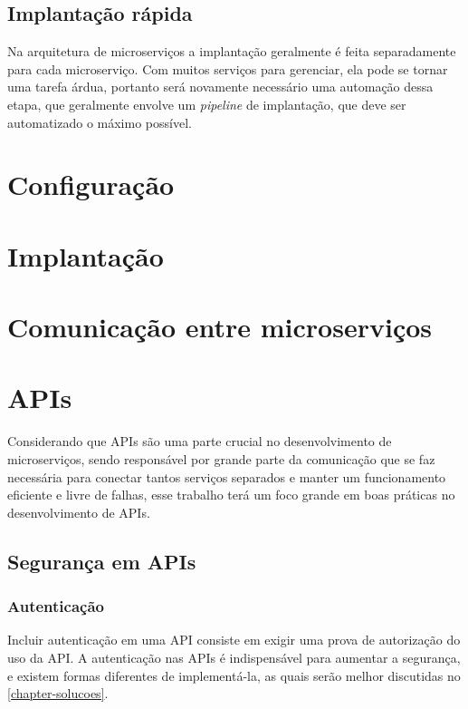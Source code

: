 \subsection{Implantação rápida}

Na arquitetura de microserviços a implantação geralmente é feita separadamente para cada microserviço. Com muitos serviços para gerenciar, ela pode se tornar uma tarefa árdua, portanto será novamente necessário uma automação dessa etapa, que geralmente envolve um \emph{pipeline} de implantação, que deve ser automatizado o máximo possível.

\section{Configuração}

\section{Implantação}

\section{Comunicação entre microserviços}

\section{APIs}

Considerando que APIs são uma parte crucial no desenvolvimento de microserviços, sendo responsável por grande parte da comunicação que se faz necessária para conectar tantos serviços separados e manter um funcionamento eficiente e livre de falhas, esse trabalho terá um foco grande em boas práticas no desenvolvimento de APIs.

\subsection{Segurança em APIs}

\subsubsection*{Autenticação}

Incluir autenticação em uma API consiste em exigir uma prova de autorização do uso da API. A autenticação nas APIs é indispensável para aumentar a segurança, e existem formas diferentes de implementá-la, as quais serão melhor discutidas no \autoref{chapter-solucoes}.

